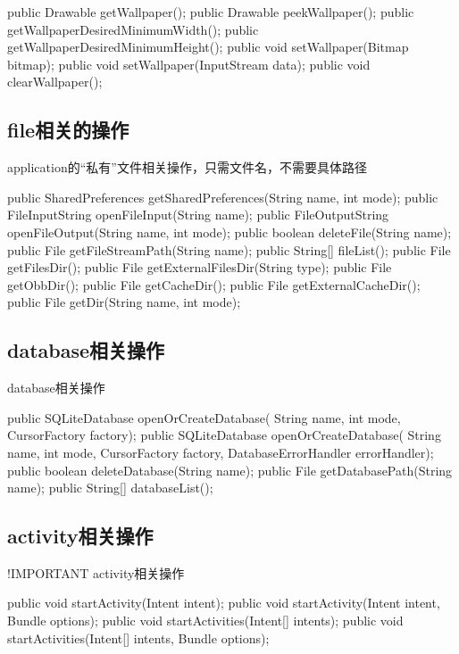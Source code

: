 ﻿\documentclass[a4paper,11pt]{article}
\begin{document}
\begin{javacode}
public Drawable getWallpaper();
public Drawable peekWallpaper();
public getWallpaperDesiredMinimumWidth();
public getWallpaperDesiredMinimumHeight();
public void setWallpaper(Bitmap bitmap);
public void setWallpaper(InputStream data);
public void clearWallpaper();
\end{javacode}

\subsection[file相关的操作]{file相关的操作}
application的“私有”文件相关操作，只需文件名，不需要具体路径

\begin{javacode}
public SharedPreferences getSharedPreferences(String name, int mode);
public FileInputString openFileInput(String name);
public FileOutputString openFileOutput(String name, int mode);
public boolean deleteFile(String name);
public File getFileStreamPath(String name);
public String[] fileList();
public File getFilesDir();
public File getExternalFilesDir(String type);
public File getObbDir();
public File getCacheDir();
public File getExternalCacheDir();
public File getDir(String name, int mode);
\end{javacode}

\subsection[database相关操作]{database相关操作}
database相关操作

\begin{javacode}
public SQLiteDatabase openOrCreateDatabase(
    String name, int mode, CursorFactory factory);
public SQLiteDatabase openOrCreateDatabase(
    String name, int mode, CursorFactory factory, DatabaseErrorHandler errorHandler);
public boolean deleteDatabase(String name);
public File getDatabasePath(String name);
public String[] databaseList();
\end{javacode}

\subsection[activity相关操作]{activity相关操作}
!IMPORTANT activity相关操作

\begin{javacode}
public void startActivity(Intent intent);
public void startActivity(Intent intent, Bundle options);
public void startActivities(Intent[] intents);
public void startActivities(Intent[] intents, Bundle options);
\end{javacode}
\end{document}
